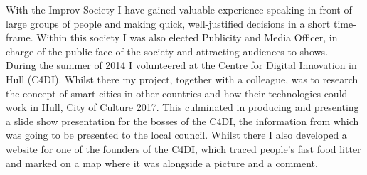 \documentclass[10pt]{article}
\begin{document}
With the Improv Society I have gained valuable experience speaking in front of large groups of people and making quick, well-justified decisions in a short time-frame.
Within this society I was also elected Publicity and Media Officer, in charge of the public face of the society and attracting audiences to shows.\\

During the summer of 2014 I volunteered at the Centre for Digital Innovation in Hull (C4DI).
Whilst there my project, together with a colleague, was to research the concept of smart cities in other countries and how their technologies could work in Hull, City of Culture 2017.
This culminated in producing and presenting a slide show presentation for the bosses of the C4DI, the information from which was going to be presented to the local council.
Whilst there I also developed a website for one of the founders of the C4DI, which traced people's fast food litter and marked on a map where it was alongside a picture and a comment.
\end{document}
